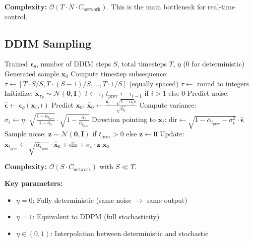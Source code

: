 \textbf{Complexity:} $\mathcal{O}(T \cdot N \cdot C_{\text{network}})$. This is the main bottleneck for real-time control.

\subsection{DDIM Sampling}
\label{subsec:ddim_algorithm}

\begin{algorithm}[H]
\caption{DDIM Sampling with Reduced Steps}
\label{alg:ddim_sampling_full}
\begin{algorithmic}[1]
\REQUIRE Trained $\boldsymbol{\epsilon}_\theta$, number of DDIM steps $S$, total timesteps $T$, $\eta$ (0 for deterministic)
\ENSURE Generated sample $\mathbf{x}_0$
\STATE Compute timestep subsequence: $\tau \gets [T \cdot S/S, T \cdot (S-1)/S, \ldots, T \cdot 1/S]$ (equally spaced)
\STATE $\tau \gets$ round to integers
\STATE Initialize: $\mathbf{x}_{\tau_S} \sim \mathcal{N}(\mathbf{0}, \mathbf{I})$
    \STATE $t \gets \tau_i$
    \STATE $t_{\text{prev}} \gets \tau_{i-1}$ if $i > 1$ else $0$
    \STATE Predict noise: $\hat{\boldsymbol{\epsilon}} \gets \boldsymbol{\epsilon}_\theta(\mathbf{x}_t, t)$
    \STATE Predict $\mathbf{x}_0$: $\hat{\mathbf{x}}_0 \gets \frac{\mathbf{x}_t - \sqrt{1-\bar{\alpha}_t}\hat{\boldsymbol{\epsilon}}}{\sqrt{\bar{\alpha}_t}}$
    \STATE Compute variance: $\sigma_t \gets \eta \cdot \sqrt{\frac{1-\bar{\alpha}_{t_{\text{prev}}}}{1-\bar{\alpha}_t}} \cdot \sqrt{1 - \frac{\bar{\alpha}_t}{\bar{\alpha}_{t_{\text{prev}}}}}$
    \STATE Direction pointing to $\mathbf{x}_t$: $\text{dir} \gets \sqrt{1-\bar{\alpha}_{t_{\text{prev}}} - \sigma_t^2} \cdot \hat{\boldsymbol{\epsilon}}$
    \STATE Sample noise: $\mathbf{z} \sim \mathcal{N}(\mathbf{0}, \mathbf{I})$ if $t_{\text{prev}} > 0$ else $\mathbf{z} \gets \mathbf{0}$
    \STATE Update: $\mathbf{x}_{t_{\text{prev}}} \gets \sqrt{\bar{\alpha}_{t_{\text{prev}}}} \cdot \hat{\mathbf{x}}_0 + \text{dir} + \sigma_t \cdot \mathbf{z}$
\ENDFOR
\RETURN $\mathbf{x}_0$
\end{algorithmic}
\end{algorithm}

\textbf{Complexity:} $\mathcal{O}(S \cdot C_{\text{network}})$ with $S \ll T$.

\textbf{Key parameters:}
\begin{itemize}
    \item $\eta = 0$: Fully deterministic (same noise $\to$ same output)
    \item $\eta = 1$: Equivalent to DDPM (full stochasticity)
    \item $\eta \in (0, 1)$: Interpolation between deterministic and stochastic
\end{itemize}

